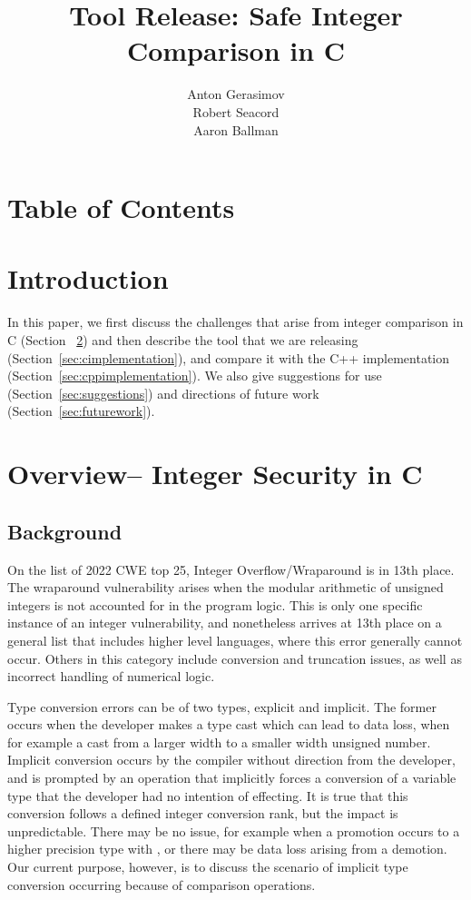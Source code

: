\documentclass[11pt,letterpaper]{article}
\title{Tool Release: Safe Integer Comparison in C}
\author{Anton Gerasimov\\
Robert Seacord\\
Aaron Ballman}
\begin{document}
\maketitle
\newpage
\thispagestyle{fancy}
\clearpage
\section*{Table of Contents}
\makeatletter
\renewcommand\tableofcontents{\@starttoc{toc}} %
\makeatother
\bgroup%
\hypersetup%
\tableofcontents
\egroup%
\thispagestyle{nccsection}
\pagebreak


\section{Introduction}

In this paper, we first discuss the challenges that arise from integer comparison in C (Section~
\ref{sec:overview}) and then describe the tool that we are releasing (Section~\ref{sec:cimplementation}), and compare it with the C++ implementation (Section~\ref{sec:cppimplementation}). We also give suggestions for use (Section~\ref{sec:suggestions}) and directions of future work (Section~\ref{sec:futurework}).



\section{Overview– Integer Security in C}
\label{sec:overview}

\subsection{Background }
On the list of 2022 CWE top 25, Integer Overflow/Wraparound is in 13th place. The wraparound vulnerability arises when the modular arithmetic of unsigned integers is not accounted for in the program logic. This is only one specific instance of an integer vulnerability, and nonetheless arrives at 13th place on a  general list that includes higher level languages, where this error generally cannot occur. Others in this category include conversion and truncation issues, as well as incorrect handling of numerical logic. 

Type conversion errors can be of two types, explicit and implicit. The former occurs when the developer makes a type cast which can lead to data loss, when for example a cast from a larger width to a smaller width unsigned number. Implicit conversion occurs by the compiler without direction from the developer, and is prompted by an operation that implicitly forces a conversion of a variable type that the developer had no intention of effecting. It is true that this conversion follows a defined integer conversion rank, but the impact is unpredictable. There may be no issue, for example when a promotion occurs to a higher precision type with , or there may be data loss arising from a demotion. Our current purpose, however, is to discuss the scenario of implicit type conversion occurring because of comparison operations.
\end{document}
